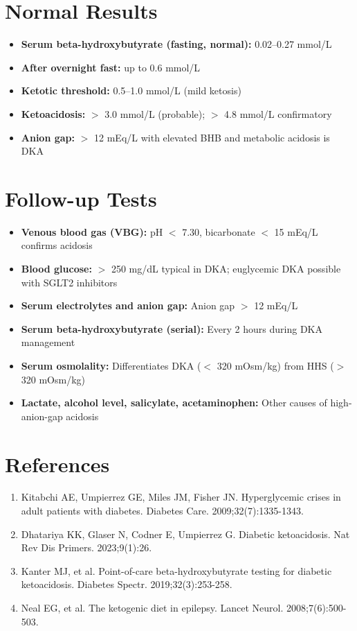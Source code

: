 \section*{Normal Results}
\begin{itemize}
  \item \textbf{Serum beta-hydroxybutyrate (fasting, normal):} 0.02--0.27 mmol/L
  \item \textbf{After overnight fast:} up to 0.6 mmol/L
  \item \textbf{Ketotic threshold:} 0.5--1.0 mmol/L (mild ketosis)
  \item \textbf{Ketoacidosis:} $>$ 3.0 mmol/L (probable); $>$ 4.8 mmol/L confirmatory
  \item \textbf{Anion gap:} $>$ 12 mEq/L with elevated BHB and metabolic acidosis is DKA
\end{itemize}

\section*{Follow-up Tests}
\begin{itemize}
  \item \textbf{Venous blood gas (VBG):} pH $<$ 7.30, bicarbonate $<$ 15 mEq/L confirms acidosis
  \item \textbf{Blood glucose:} $>$ 250 mg/dL typical in DKA; euglycemic DKA possible with SGLT2 inhibitors
  \item \textbf{Serum electrolytes and anion gap:} Anion gap $>$ 12 mEq/L
  \item \textbf{Serum beta-hydroxybutyrate (serial):} Every 2 hours during DKA management
  \item \textbf{Serum osmolality:} Differentiates DKA ($<$ 320 mOsm/kg) from HHS ($>$ 320 mOsm/kg)
  \item \textbf{Lactate, alcohol level, salicylate, acetaminophen:} Other causes of high-anion-gap acidosis
\end{itemize}

\section*{References}
\begin{enumerate}
  \item Kitabchi AE, Umpierrez GE, Miles JM, Fisher JN. Hyperglycemic crises in adult patients with diabetes. Diabetes Care. 2009;32(7):1335-1343.
  \item Dhatariya KK, Glaser N, Codner E, Umpierrez G. Diabetic ketoacidosis. Nat Rev Dis Primers. 2023;9(1):26.
  \item Kanter MJ, et al. Point-of-care beta-hydroxybutyrate testing for diabetic ketoacidosis. Diabetes Spectr. 2019;32(3):253-258.
  \item Neal EG, et al. The ketogenic diet in epilepsy. Lancet Neurol. 2008;7(6):500-503.
\end{enumerate}

\clearpage